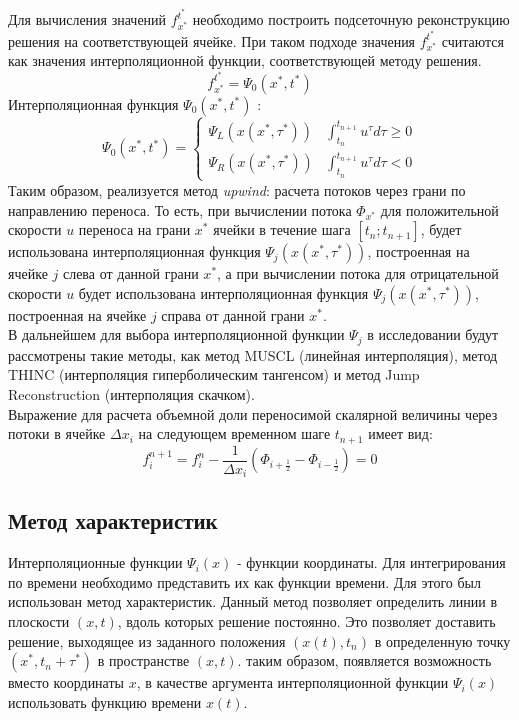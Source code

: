 \documentclass[12pt,a4paper]{article}
\begin{document}
Для вычисления значений $f_{x^*}^{t^*}$ необходимо построить подсеточную реконструкцию решения на соответствующей ячейке. При таком подходе значения $f_{x^*}^{t^*}$ считаются как значения интерполяционной функции, соответствующей методу решения.
\[
f_{x^*}^{t^*} = \Psi_0(x^*, t^*)
\]
Интерполяционная функция $\Psi_0(x^*, t^*)$ :
\begin{equation}
\label{eqn:PsyIntrpolationFunc}
\Psi_0(x^*, t^*) = \begin{cases}
\Psi_{L}(x(x^*,\tau^*))
& \int_{t_n}^{t_{n+1}} u^{\tau}d\tau\geq0
\\
\Psi_{R}(x(x^*,\tau^*))
& \int_{t_n}^{t_{n+1}} u^{\tau}d\tau < 0
\end{cases}
\end{equation}
Таким образом, реализуется метод \textit{upwind}: расчета потоков через грани по направлению переноса.
То есть, при вычислении потока $\Phi_{x^*}$ для положительной скорости $u$ переноса на грани $x^*$ ячейки в течение шага $[t_n; t_{n+1}]$, будет использована интерполяционная функция $\Psi_{j}(x(x^*,\tau^*))$, построенная на ячейке $j$ слева от данной грани $x^*$, а при вычислении потока для отрицательной скорости $u$ будет использована интерполяционная функция $\Psi_{j}(x(x^*,\tau^*))$, построенная на ячейке $j$ справа от данной грани $x^*$.\\

В дальнейшем для выбора интерполяционной функции $\Psi_{j}$ в исследовании будут рассмотрены такие методы, как метод MUSCL (линейная интерполяция), метод THINC (интерполяция гиперболическим тангенсом) и метод Jump Reconstruction (интерполяция скачком).\\

Выражение для расчета объемной доли переносимой скалярной величины через потоки в ячейке $\Delta x_i$ на следующем временном шаге $t_{n+1}$ имеет вид:
\begin{equation}
\label{fiNextFlows}
f_i^{n+1}=f_i^n
-
\frac{1}{\Delta x_i} (
\Phi_{i+\frac{1}{2}}
-
\Phi_{i-\frac{1}{2}}
)=0
\end{equation}

\subsection{Метод характеристик}
Интерполяционные функции $\Psi_i(x)$ - функции координаты. Для интегрирования по времени необходимо представить их как функции времени. Для этого был использован метод характеристик. Данный метод позволяет определить линии в плоскости $(x, t)$, вдоль которых решение постоянно. Это позволяет доставить решение, выходящее из заданного положения $(x(t), t_n)$ в определенную точку $(x^*, t_n+\tau^*)$ в пространстве $(x, t)$. таким образом, появляется возможность вместо координаты $x$, в качестве аргумента интерполяционной функции $\Psi_i(x)$ использовать функцию времени $x(t)$.
\end{document}
